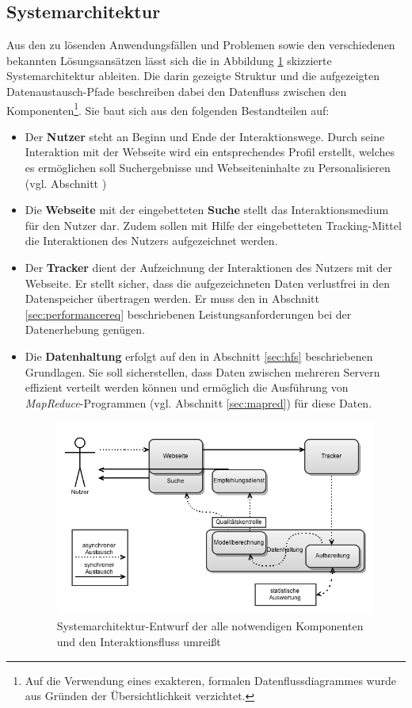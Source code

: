 \subsection{Systemarchitektur}\label{sec:system_rough}

Aus den zu lösenden Anwendungsfällen und Problemen sowie den verschiedenen bekannten Lösungsansätzen lässt sich die in Abbildung \ref{fig:system_rough} skizzierte Systemarchitektur ableiten. Die darin gezeigte Struktur und die aufgezeigten Datenaustausch-Pfade beschreiben dabei den Datenfluss zwischen den Komponenten\footnote{Auf die Verwendung eines exakteren, formalen Datenflussdiagrammes wurde aus Gründen der Übersichtlichkeit verzichtet.}. Sie baut sich aus den folgenden Bestandteilen auf:

\begin{itemize}
\item Der \textbf{Nutzer} steht an Beginn und Ende der Interaktionswege. Durch seine Interaktion mit der Webseite wird ein entsprechendes Profil erstellt, welches es ermöglichen soll Suchergebnisse und Webseiteninhalte  zu Personalisieren (vgl. Abschnitt \label{sec:userstories})
\item Die \textbf{Webseite} mit der eingebetteten \textbf{Suche} stellt das Interaktionsmedium für den Nutzer dar. Zudem sollen mit Hilfe der eingebetteten Tracking-Mittel die Interaktionen des Nutzers aufgezeichnet werden.
\item Der \textbf{Tracker} dient der Aufzeichnung der Interaktionen des Nutzers mit der Webseite. Er stellt sicher, dass die aufgezeichneten Daten verlustfrei in den Datenspeicher übertragen werden. Er muss den in Abschnitt \ref{sec:performancereq} beschriebenen Leistungsanforderungen bei der Datenerhebung genügen.
\item Die \textbf{Datenhaltung} erfolgt auf den in Abschnitt \ref{sec:hfs} beschriebenen Grundlagen. Sie soll sicherstellen, dass Daten zwischen mehreren  Servern effizient verteilt werden können und ermöglich die Ausführung von \textit{MapReduce}-Programmen (vgl. Abschnitt \ref{sec:mapred}) für diese Daten.

\begin{figure}[H]
  \centering
    \includegraphics[width=\textwidth]{Abbildungen/Systemmodell.png}
    \caption[Systenarchitektur]{\footnotesize Systemarchitektur-Entwurf der alle notwendigen Komponenten und den Interaktionsfluss umreißt}
    \label{fig:system_rough}
\end{figure}


\end{itemize}
